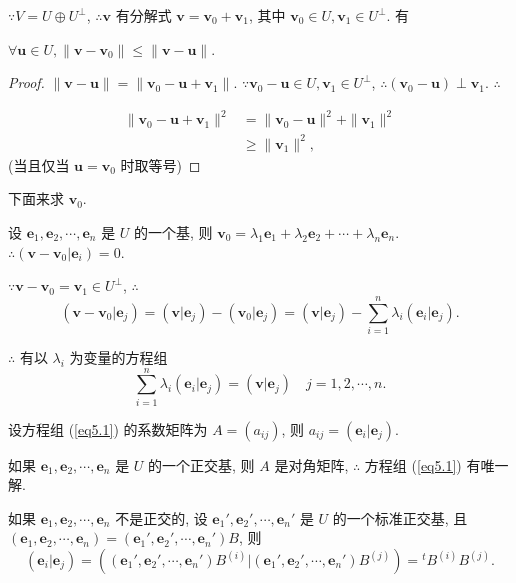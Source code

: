 \documentclass[color=black,device=normal,lang=cn,mode=geye]{elegantnote}
\begin{document}
$\because V=U\oplus U^\perp$, $\therefore\boldsymbol{v}$ 有分解式 $\boldsymbol{v}=\boldsymbol{v}_0+\boldsymbol{v}_1$, 其中 $\boldsymbol{v}_0\in U,\boldsymbol{v}_1\in U^\perp$. 有
\begin{theorem}\label{t5.1}
    $\forall\boldsymbol{u}\in U,\|\boldsymbol{v}-\boldsymbol{v}_0\|\leq\|\boldsymbol{v}-\boldsymbol{u}\|$.
\end{theorem}
\begin{proof}
    $\|\boldsymbol{v}-\boldsymbol{u}\|=\|\boldsymbol{v}_0-\boldsymbol{u}+\boldsymbol{v}_1\|$. $\because\boldsymbol{v}_0-\boldsymbol{u}\in U,\boldsymbol{v}_1\in U^\perp$, $\therefore(\boldsymbol{v}_0-\boldsymbol{u})\perp\boldsymbol{v}_1$. $\therefore$

    \begin{align*}
        \|\boldsymbol{v}_0-\boldsymbol{u}+\boldsymbol{v}_1\|^2 & =\|\boldsymbol{v}_0-\boldsymbol{u}\|^2+\|\boldsymbol{v}_1\|^2 \\
        & \geq\|\boldsymbol{v}_1\|^2,
    \end{align*}
    (当且仅当 $\boldsymbol{u}=\boldsymbol{v}_0$ 时取等号)
\end{proof}
下面来求 $\boldsymbol{v}_0$.

设 $\boldsymbol{e}_1,\boldsymbol{e}_2,\cdots,\boldsymbol{e}_n$ 是 $U$ 的一个基, 则 $\boldsymbol{v}_0=\lambda_1\boldsymbol{e}_1+\lambda_2\boldsymbol{e}_2+\cdots+\lambda_n\boldsymbol{e}_n$. $\therefore(\boldsymbol{v}-\boldsymbol{v}_0|\boldsymbol{e}_i)=0$.

$\because\boldsymbol{v}-\boldsymbol{v}_0=\boldsymbol{v}_1\in U^\perp$, $\therefore$
\[(\boldsymbol{v}-\boldsymbol{v}_0|\boldsymbol{e}_j)=(\boldsymbol{v}|\boldsymbol{e}_j)-(\boldsymbol{v}_0|\boldsymbol{e}_j)=(\boldsymbol{v}|\boldsymbol{e}_j)-\sum\limits_{i=1}^n\lambda_i(\boldsymbol{e}_i|\boldsymbol{e}_j).\]

$\therefore$ 有以 $\lambda_i$ 为变量的方程组
\begin{equation}\label{eq5.1}
    \sum\limits_{i=1}^n\lambda_i(\boldsymbol{e}_i|\boldsymbol{e}_j)=(\boldsymbol{v}|\boldsymbol{e}_j)\quad j=1,2,\cdots,n.
\end{equation}

设方程组 (\ref{eq5.1}) 的系数矩阵为 $A=(a_{ij})$, 则 $a_{ij}=(\boldsymbol{e}_i|\boldsymbol{e}_j)$.

如果 $\boldsymbol{e}_1,\boldsymbol{e}_2,\cdots,\boldsymbol{e}_n$ 是 $U$ 的一个正交基, 则 $A$ 是对角矩阵, $\therefore$ 方程组 (\ref{eq5.1}) 有唯一解.

如果 $\boldsymbol{e}_1,\boldsymbol{e}_2,\cdots,\boldsymbol{e}_n$ 不是正交的, 设 $\boldsymbol{e}_1',\boldsymbol{e}_2',\cdots,\boldsymbol{e}_n'$ 是 $U$ 的一个标准正交基, 且 $(\boldsymbol{e}_1,\boldsymbol{e}_2,\cdots,\boldsymbol{e}_n)=(\boldsymbol{e}_1',\boldsymbol{e}_2',\cdots,\boldsymbol{e}_n')B$, 则
\[(\boldsymbol{e}_i|\boldsymbol{e}_j)=\left((\boldsymbol{e}_1',\boldsymbol{e}_2',\cdots,\boldsymbol{e}_n')B^{(i)}\Big|(\boldsymbol{e}_1',\boldsymbol{e}_2',\cdots,\boldsymbol{e}_n')B^{(j)}\right)={}^tB^{(i)}B^{(j)}.\]
\end{document}
